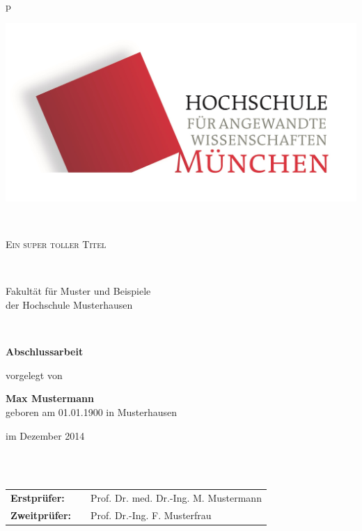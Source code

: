 \begin{center}
\begin{tabular}{p{\textwidth}}


\begin{center}
\includegraphics[scale=0.2]{img/logos.jpg}
\end{center}


\\

\begin{center}
\LARGE{\textsc{
Ein super toller Titel \\
}}
\end{center}

\\


\begin{center}
\large{Fakultät für Muster und Beispiele \\
der Hochschule Musterhausen \\}
\end{center}

\\

\begin{center}
\textbf{\Large{Abschlussarbeit}}
\end{center}



\begin{center}
vorgelegt von
\end{center}

\begin{center}
\large{\textbf{Max Mustermann}} \\
\small{geboren am 01.01.1900 in Musterhausen}
\end{center}

\begin{center}
\large{im Dezember 2014}
\end{center}

\\

\\

\begin{center}
\begin{tabular}{lll}
\textbf{Erstprüfer:} & & Prof. Dr. med. Dr.-Ing. M. Mustermann\\
\textbf{Zweitprüfer:} & &Prof. Dr.-Ing. F. Musterfrau\\
\end{tabular}
\end{center}

\end{tabular}
\end{center}
